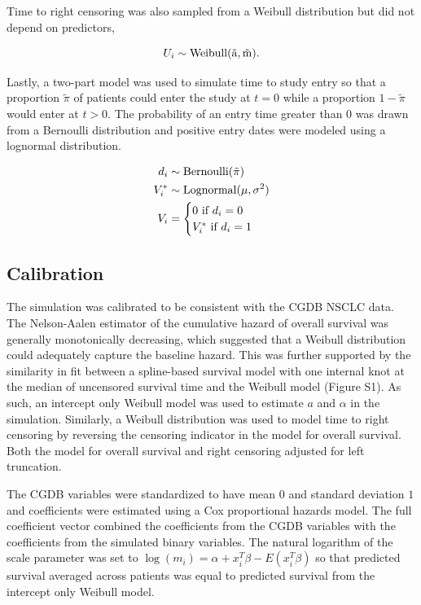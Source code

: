 \documentclass[11pt,final,fleqn]{article}\usepackage[]{graphicx}\usepackage[]{color}
\theoremstyle{plain}
\begin{document}
Time to right censoring was also sampled from a Weibull distribution but did not depend on predictors, 

\begin{equation} 
U_i \sim \rm{Weibull}(\tilde{a}, \tilde{m}).
\end{equation} 

Lastly, a two-part model was used to simulate time to study entry so that a proportion $\tilde{\pi}$ of patients could enter the study at $t=0$ while a proportion $1-\tilde{\pi}$ would enter at $t>0$. The probability of an entry time greater than $0$ was drawn from a Bernoulli distribution and positive entry dates were modeled using a lognormal distribution. 

\begin{align}
d_i &\sim \rm{Bernoulli}(\tilde{\pi}) \\
V_i^{*} &\sim \rm{Lognormal}(\mu, \sigma^2) \\
V_i &=\begin{cases}
 0  \text{ if } d_i = 0\\
  V_i^{*}  \text{ if } d_i = 1
  \end{cases}
\end{align}

\subsection{Calibration} \label{subsec:sim-calibration}
The simulation was calibrated to be consistent with the CGDB NSCLC data. The Nelson-Aalen estimator of the cumulative hazard of overall survival was generally monotonically decreasing, which suggested that a Weibull distribution could adequately capture the baseline hazard. This was further supported by the similarity in fit between a spline-based survival model with one internal knot at the median of uncensored survival time and the Weibull model (Figure S1). As such, an intercept only Weibull model was used to estimate $a$ and $\alpha$ in the simulation. Similarly, a Weibull distribution was used to model time to right censoring by reversing the censoring indicator in the model for overall survival. Both the model for overall survival and right censoring adjusted for left truncation. 

The CGDB variables were standardized to have mean $0$ and standard deviation $1$ and coefficients were estimated using a Cox proportional hazards model. The full coefficient vector combined the coefficients from the CGDB variables with the coefficients from the simulated binary variables. The natural logarithm of the scale parameter was set to $\log(m_i) = \alpha + x^T_i\beta - E(x^T_i\beta)$ so that predicted survival averaged across patients was equal to predicted survival from the intercept only Weibull model. 
\end{document}
